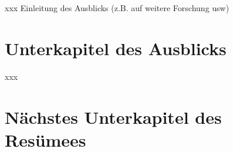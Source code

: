 xxx  Einleitung des Ausblicks (z.B. auf weitere Forschung usw)

\section{Unterkapitel des Ausblicks}

xxx 

\section{Nächstes Unterkapitel des  Resümees} 

